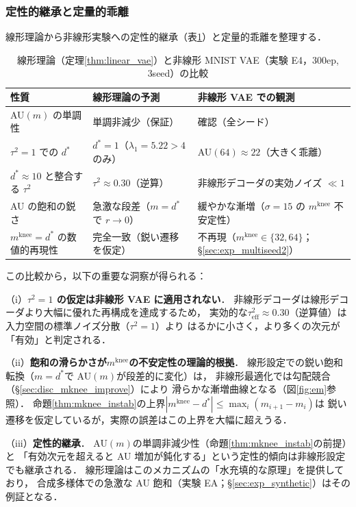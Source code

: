\documentclass[11pt,a4paper]{jsarticle}
\newcommand{\mknee}{m^{\mathrm{knee}}}
\begin{document}
\subsubsection*{定性的継承と定量的乖離}

線形理論から非線形実験への定性的継承（表\ref{tab:theory_inherit}）と定量的乖離を整理する．

\begin{table}[H]
\centering
\caption{線形理論（定理\ref{thm:linear_vae}）と非線形 MNIST VAE（実験 E4，300ep, 3seed）の比較}
\label{tab:theory_inherit}
\small
\begin{tabular}{lll}
\toprule
性質 & 線形理論の予測 & 非線形 VAE での観測 \\
\midrule
AU$(m)$ の単調性 & 単調非減少（保証） & 確認（全シード） \\
$\tau^2=1$ での $d^*$ & $d^*=1$（$\lambda_1=5.22>4$ のみ） & AU$(64) \approx 22$（大きく乖離） \\
$d^* \approx 10$ と整合する $\tau^2$ & $\tau^2 \approx 0.30$（逆算） & 非線形デコーダの実効ノイズ $\ll 1$ \\
AU の飽和の鋭さ & 急激な段差（$m=d^*$ で $r\to 0$） & 緩やかな漸増（$\sigma=15$ の $\mknee$ 不安定性） \\
$\mknee = d^*$ の数値的再現性 & 完全一致（鋭い遷移を仮定） & 不再現（$\mknee \in \{32,64\}$；§\ref{sec:exp_multiseed2}） \\
\bottomrule
\end{tabular}
\end{table}

この比較から，以下の重要な洞察が得られる：

（i）\textbf{$\tau^2 = 1$ の仮定は非線形 VAE に適用されない}．
非線形デコーダは線形デコーダより大幅に優れた再構成を達成するため，
実効的な$\tau^2_{\mathrm{eff}} \approx 0.30$（逆算値）は入力空間の標準ノイズ分散（$\tau^2=1$）より
はるかに小さく，より多くの次元が「有効」と判定される．

（ii）\textbf{飽和の滑らかさが$\mknee$の不安定性の理論的根拠}．
線形設定での鋭い飽和転換（$m=d^*$で AU$(m)$が段差的に変化）は，
非線形最適化では勾配競合（§\ref{sec:disc_mknee_improve}）により
滑らかな漸増曲線となる（図\ref{fig:em}参照）．
命題\ref{thm:mknee_instab}の上界$|\mknee - d^*| \leq \max_i(m_{i+1}-m_i)$は
鋭い遷移を仮定しているが，実際の誤差はこの上界を大幅に超えうる．

（iii）\textbf{定性的継承}．
AU$(m)$の単調非減少性（命題\ref{thm:mknee_instab}の前提）と
「有効次元を超えると AU 増加が鈍化する」という定性的傾向は非線形設定でも継承される．
線形理論はこのメカニズムの「水充填的な原理」を提供しており，
合成多様体での急激な AU 飽和（実験 EA；§\ref{sec:exp_synthetic}）はその例証となる．
\end{document}
